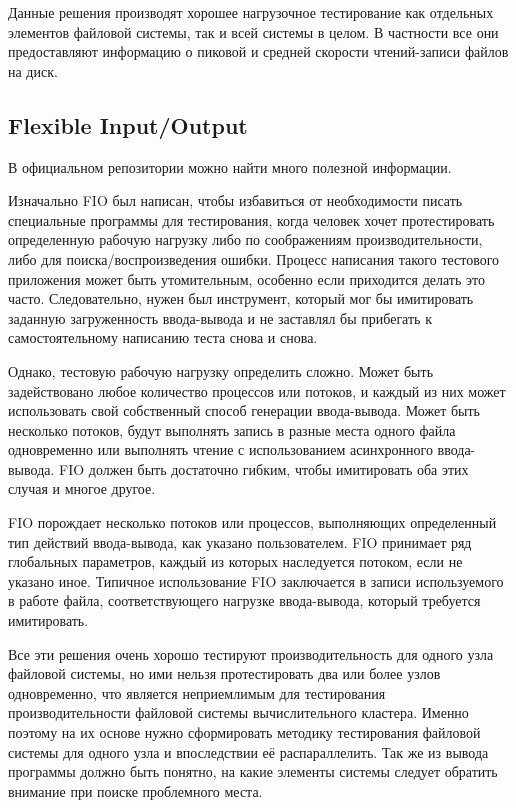Данные решения производят хорошее нагрузочное тестирование как отдельных элементов файловой системы,
так и всей системы в целом. В частности все они предоставляют информацию о пиковой и средней скорости чтений-записи файлов на диск.

\subsection{Flexible Input/Output}

В официальном репозитории можно найти много полезной информации.\cite{fio}

Изначально FIO был написан, чтобы избавиться от необходимости писать специальные
программы для тестирования, когда человек хочет протестировать определенную рабочую
нагрузку либо по соображениям производительности, либо для поиска/воспроизведения ошибки.
Процесс написания такого тестового приложения может быть утомительным, особенно если
приходится делать это часто. Следовательно, нужен был инструмент, который мог бы имитировать
заданную загруженность ввода-вывода и не заставлял бы прибегать к самостоятельному написанию
теста снова и снова.

Однако, тестовую рабочую нагрузку определить сложно. Может быть задействовано любое количество
процессов или потоков, и каждый из них может использовать свой собственный способ генерации
ввода-вывода. Может быть несколько потоков, будут выполнять запись в разные места одного файла одновременно или выполнять чтение с использованием асинхронного ввода-вывода. FIO должен
быть достаточно гибким, чтобы имитировать оба этих случая и многое другое.

FIO порождает несколько потоков или процессов, выполняющих определенный тип действий ввода-вывода,
как указано пользователем. FIO принимает ряд глобальных параметров, каждый из которых наследуется
потоком, если не указано иное. Типичное использование FIO заключается в записи используемого в
работе файла, соответствующего нагрузке ввода-вывода, который требуется имитировать.\newline\newline\newline

Все эти решения очень хорошо тестируют производительность для одного узла файловой системы,
но ими нельзя протестировать два или более узлов одновременно, что является неприемлимым для
тестирования производительности файловой системы вычислительного кластера. Именно поэтому на 
их основе нужно сформировать методику тестирования файловой системы для одного узла и впоследствии
её распараллелить. Так же из вывода программы должно быть понятно, на какие элементы системы следует
обратить внимание при поиске проблемного места.

